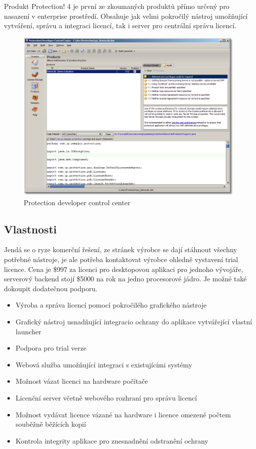Produkt Protection! 4\cite{protection} je první ze zkoumaných produktů přímo
určený pro nasazení v enterprise prostředí. Obsahuje jak velmi pokročilý nástroj
umožňující vytváření, správu a integraci licencí, tak i server pro centrální
správu licencí.

\begin{figure}[H]
\begin{center}
\includegraphics[width=16cm]{figures/protection4.PNG}
\caption{Protection developer control center}
\label{fig:protection4-ui} 
\end{center}
\end{figure}

\subsection*{Vlastnosti}
Jendá se o ryze komerční řešení, ze stránek výrobce se dají stáhnout všechny
potřebné nástroje, je ale potřeba kontaktovat výrobce ohledně vystavení trial
licence. Cena je \$997 za licenci pro desktopovou aplikaci pro jednoho
vývojáře, serverový backend stojí \$5000 na rok na jedno procesorové jádro. Je
možné také dokoupit dodatečnou podporu.

\begin{itemize}
  \item Výroba a správa licencí pomocí pokročilého grafického nástroje
  \item Grafický nástroj usnadňující integracio ochrany do aplikace vytvářející
  vlastní launcher
  \item Podpora pro trial verze
  \item Webová služba umožňující integraci s existujícími systémy
  \item Možnost vázat licenci na hardware počítače
  \item Licenční server včetně webového rozhraní pro správu licencí
  \item Možnost vydávat licence vázané na hardware i licence omezené počtem
  souběžně běžících kopií
  \item Kontrola integrity aplikace pro znesnadnění odstranění ochrany
\end{itemize}

